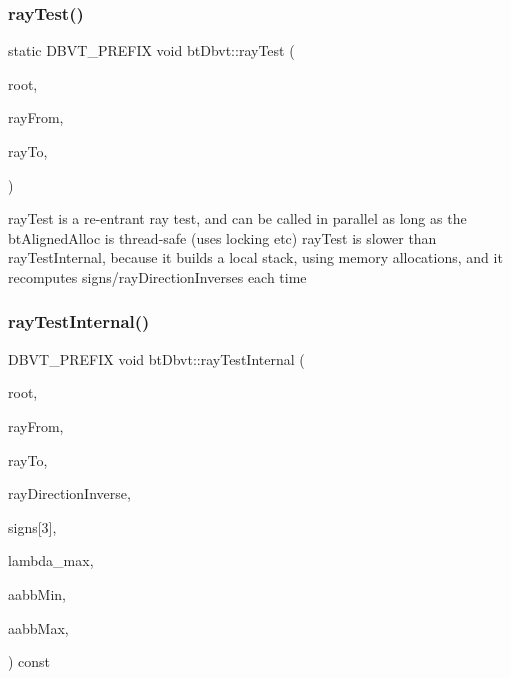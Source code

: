 \subsubsection{\texorpdfstring{ray\+Test()}{rayTest()}\hspace{0.1cm}{\footnotesize\ttfamily [2/2]}}
{\footnotesize\ttfamily static D\+B\+V\+T\+\_\+\+P\+R\+E\+F\+IX void bt\+Dbvt\+::ray\+Test (\begin{DoxyParamCaption}\item[{const \hyperlink{structbtDbvtNode}{bt\+Dbvt\+Node} $\ast$}]{root,  }\item[{const bt\+Vector3 \&}]{ray\+From,  }\item[{const bt\+Vector3 \&}]{ray\+To,  }\item[{D\+B\+V\+T\+\_\+\+I\+P\+O\+L\+I\+CY}]{ }\end{DoxyParamCaption})\hspace{0.3cm}{\ttfamily [static]}}

ray\+Test is a re-\/entrant ray test, and can be called in parallel as long as the bt\+Aligned\+Alloc is thread-\/safe (uses locking etc) ray\+Test is slower than ray\+Test\+Internal, because it builds a local stack, using memory allocations, and it recomputes signs/ray\+Direction\+Inverses each time \mbox{\label{structbtDbvt_a0704881c8799d5326308a6bf210fdfd3}} 
\subsubsection{\texorpdfstring{ray\+Test\+Internal()}{rayTestInternal()}\hspace{0.1cm}{\footnotesize\ttfamily [1/2]}}
{\footnotesize\ttfamily D\+B\+V\+T\+\_\+\+P\+R\+E\+F\+IX void bt\+Dbvt\+::ray\+Test\+Internal (\begin{DoxyParamCaption}\item[{const \hyperlink{structbtDbvtNode}{bt\+Dbvt\+Node} $\ast$}]{root,  }\item[{const bt\+Vector3 \&}]{ray\+From,  }\item[{const bt\+Vector3 \&}]{ray\+To,  }\item[{const bt\+Vector3 \&}]{ray\+Direction\+Inverse,  }\item[{unsigned int}]{signs\mbox{[}3\mbox{]},  }\item[{bt\+Scalar}]{lambda\+\_\+max,  }\item[{const bt\+Vector3 \&}]{aabb\+Min,  }\item[{const bt\+Vector3 \&}]{aabb\+Max,  }\item[{D\+B\+V\+T\+\_\+\+I\+P\+O\+L\+I\+CY}]{ }\end{DoxyParamCaption}) const}

